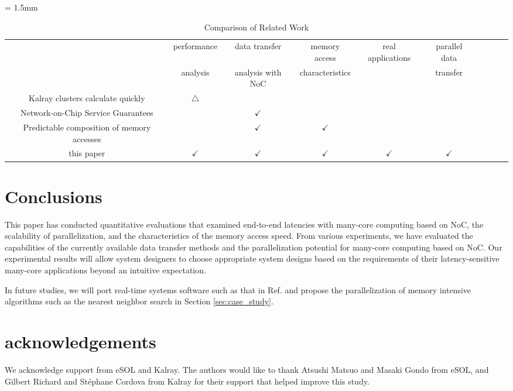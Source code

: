 \documentclass{sig-alternate-05-2015}
\begin{document}
\begin{table}[t]
  \caption{\label{tb:comparison_relatedwork}
    Comparison of Related Work}
  \centering
  \scriptsize	                    %
  \tabcolsep = 1.5mm              %
  \begin{tabular}{c|ccccccccc}
    \hline
    & performance & data transfer & memory access & \multirow{2}{*}{real applications} & parallel data & \\
    & analysis & analysis with NoC & characteristics & & transfer & \\
    \hline
    \hline
    Kalray clusters calculate quickly \cite{kanter2015kalray} & \(\bigtriangleup\) &  &  &  &  & \\
    Network-on-Chip Service Guarantees \cite{denet2017work} &  & \(\checkmark\) &  &  &  & \\
    Predictable composition of memory accesses \cite{perret2016predictable} &  & \(\checkmark\) & \(\checkmark\) &  &  & \\
    this paper & \(\checkmark\) & \(\checkmark\) & \(\checkmark\) & \(\checkmark\) & \(\checkmark\) & \\
    \hline
  \end{tabular}
  \vspace{-5mm}
\end{table}


\section{Conclusions}
\label{sec:conclusion}
This paper has conducted quantitative evaluations that examined end-to-end latencies with many-core computing based on NoC, the scalability of parallelization, and the characteristics of the memory access speed.
From various experiments, we have evaluated the capabilities of the currently available data transfer methods and the parallelization potential for many-core computing based on NoC.
Our experimental results will allow system designers to choose appropriate system designs based on the requirements of their latency-sensitive many-core applications beyond an intuitive expectation.

In future studies, we will port real-time systems software such as that in Ref. \cite{maruyama2016ros2} and propose the parallelization of memory intensive algorithms such as the nearest neighbor search in Section \ref{sec:case_study}.

\vspace{-5mm}
\section{acknowledgements}
\label{sec:acknowledgements}
We acknowledge support from eSOL and Kalray.
The authors would like to thank Atsushi Matsuo and Masaki Gondo from eSOL, and Gilbert Richard and Stéphane Cordova from Kalray for their support that helped improve this study.


\end{document}
